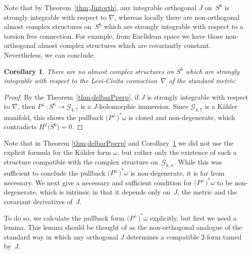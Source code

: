 \documentclass[pdftex]{sigma}
\newtheorem{cor}[thm]{Corollary}
\numberwithin{equation}{section}
\newcommand{\cG}{{\mathcal G}}
\begin{document}
Note that by Theorem~\ref{thm;Jintorth}, any integrable orthogonal $J$ on~$S^6$ is strongly integrable with respect to $\nabla$, whereas locally there are non-orthogonal almost complex structures on~$S^6$ which are strongly integrable with respect to a torsion free connection. For example, from Euclidean space we have those non-orthogonal almost complex structures which are covariantly constant. Nevertheless, we can conclude:

\begin{cor} \label{cor;noStrongJ}There are no almost complex structures on $S^6$ which are strongly integrable with respect to the Levi-Civita connection~$\nabla$ of the standard metric.
\end{cor}

\begin{proof} By the Theorem~\ref{thm;delbarPperp}, if $J$ is strongly integrable with respect to $\nabla$, then $P^\perp\colon S^6 \to \cG_{4,7}$ is a $J$-holomorphic immersion. Since $\cG_{4,7}$ is a K\"ahler manifold, this shows the pullback $\big(P^\perp \big)^*\omega$ is closed and non-degenerate, which contradicts $H^2\big(S^6\big) =0$.
\end{proof}

Note that in Theorem \ref{thm;delbarPperp} and Corollary~\ref{cor;noStrongJ} we did not use the explicit formula for the K\"ahler form $\omega$, but rather only the existence of such a structure compatible with the complex structure on~$\cG_{k,n}$. While this was sufficient to conclude the pullback $\big(P^\perp\big)^*\omega$ is non-degenerate, it is far from necessary. We next give a necessary and sufficient condition for $\big(P^\perp\big)^*\omega$ to be non-degenerate, which is intrinsic in that it depends only on~$J$, the metric and the covariant derivatives of~$J$.

To do so, we calculate the pullback form $\big(P^\perp\big)^*\omega$ explicitly, but first we need a lemma. This lemma should be thought of as the non-orthogonal analogue of the standard way in which any orthogonal $J$ determines a compatible $2$-form tamed by~$J$.
\end{document}
